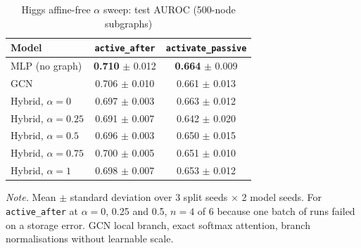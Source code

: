 \begin{table}[htbp]
\caption{Higgs affine-free $\alpha$ sweep: test AUROC (500-node subgraphs)}
\label{tab:higgsB}
\centering\small
\begin{tabular}{@{}lcc@{}}
\toprule
Model & \texttt{active\_\allowbreak after} & \texttt{activate\_\allowbreak passive} \\
\midrule
MLP (no graph) & \textbf{0.710} $\pm$ 0.012 & \textbf{0.664} $\pm$ 0.009 \\
GCN & 0.706 $\pm$ 0.010 & 0.661 $\pm$ 0.013 \\
Hybrid, $\alpha=0$ & 0.697 $\pm$ 0.003 & 0.663 $\pm$ 0.012 \\
Hybrid, $\alpha=0.25$ & 0.691 $\pm$ 0.007 & 0.642 $\pm$ 0.020 \\
Hybrid, $\alpha=0.5$ & 0.696 $\pm$ 0.003 & 0.650 $\pm$ 0.015 \\
Hybrid, $\alpha=0.75$ & 0.700 $\pm$ 0.005 & 0.651 $\pm$ 0.010 \\
Hybrid, $\alpha=1$ & 0.698 $\pm$ 0.007 & 0.653 $\pm$ 0.012 \\
\bottomrule
\end{tabular}

\vspace{4pt}
\parbox{0.85\textwidth}{\footnotesize\textit{Note.} Mean $\pm$ standard deviation over 3 split seeds $\times$ 2 model seeds. For \texttt{active\_\allowbreak after} at $\alpha=0$, 0.25 and 0.5, $n=4$ of 6 because one batch of runs failed on a storage error. GCN local branch, exact softmax attention, branch normalisations without learnable scale.}
\end{table}

